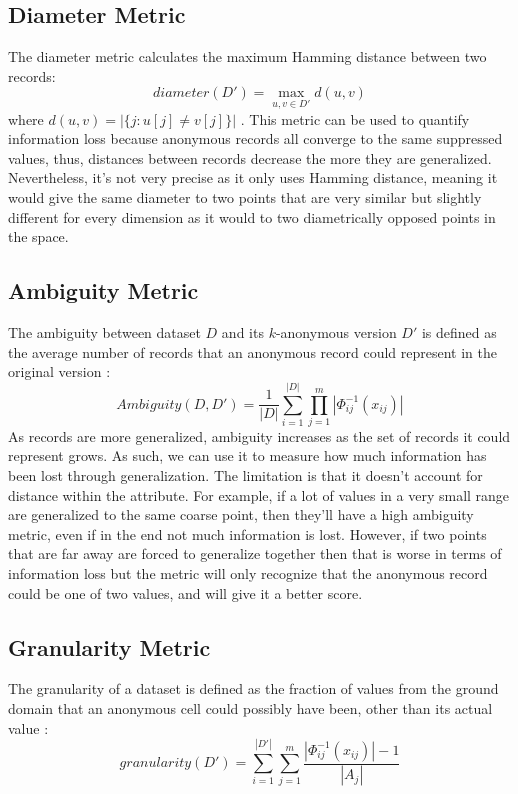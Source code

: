 \subsection{Diameter Metric}
The diameter metric calculates the maximum Hamming distance between two records: 
$$
    diameter(D') = \max_{u, v \in D'}d(u,v)
$$
where  $d(u,v) = |\{j: u[j] \not= v[j]\}|$ \cite{meyerson2004complexity}. This metric can be used to quantify information loss because anonymous records all converge to the same suppressed values, thus, distances between records decrease the more they are generalized. Nevertheless, it's not very precise as it only uses Hamming distance, meaning it would give the same diameter to two points that are very similar but slightly different for every dimension as it would to two diametrically opposed points in the space. 



\subsection{Ambiguity Metric}
The ambiguity between dataset $D$ and its $k$-anonymous version $D'$ is defined as the average number of records that an anonymous record could represent in the original version \cite{ambiguity_metric}: 
$$
    Ambiguity(D,D') = \frac{1}{|D|} \sum_{i=1}^{|D|}\prod_{j=1}^{m}|\Phi^{-1}_{ij}(x_{ij})|
$$
As records are more generalized, ambiguity increases as the set of records it could represent grows. As such, we can use it to measure how much information has been lost through generalization. The limitation is that it doesn't account for distance within the attribute. For example, if a lot of values in a very small range are generalized to the same coarse point, then they'll have a high ambiguity metric, even if in the end not much information is lost. However, if two points that are far away are forced to generalize together then that is worse in terms of information loss but the metric will only recognize that the anonymous record could be one of two values, and will give it a better score.

\subsection{Granularity Metric}
The granularity of a dataset is defined as the fraction of values from the ground domain that an anonymous cell could possibly have been, other than its actual value \cite{cm_granularity_metric}:
$$
    granularity(D') = \sum_{i=1}^{|D'|} \sum_{j=1}^{m} \frac{\left|\Phi^{-1}_{ij}(x_{ij})\right| - 1}{|A_j|}
$$

